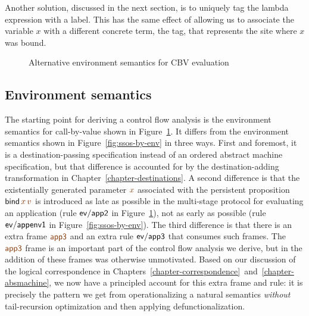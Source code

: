 Another solution, discussed in the next
section, is to uniquely tag the lambda expression with a label. This
has the same effect of allowing us to associate the variable $x$
with a different concrete term, the tag, that represents the site
where $x$ was bound.






\begin{figure}
\caption{Alternative environment semantics for CBV evaluation}
\label{fig:dest-env}
\end{figure}

\subsection{Environment semantics}


The starting point for deriving a control flow analysis is the
environment semantics for call-by-value shown in
Figure~\ref{fig:dest-env}. It differs from the environment semantics
shown in Figure~\ref{fig:ssos-by-env} in three ways. First and
foremost, it is a destination-passing specification instead of an
ordered abstract machine specification, but that difference is
accounted for by the destination-adding transformation in 
Chapter~\ref{chapter-destinations}.
A second difference is that the existentially generated parameter
$\lf{x}$ associated with the persistent proposition ${\sf
  bind}\,\lf{x}\,\lf{v}$ is introduced as late as possible in the
multi-stage protocol for evaluating an application (rule ${\sf
  ev/app2}$ in Figure~\ref{fig:dest-env}), not as early as possible
(rule ${\sf ev/appenv1}$ in Figure~\ref{fig:ssos-by-env}). The third
difference is that there is an extra frame $\lf{\sf app3}$ and an
extra rule ${\sf ev/app3}$ that consumes such frames. The $\lf{\sf
  app3}$ frame is an important part of the control flow analysis we
derive, but in \cite{simmons11logical} the addition of these frames
was otherwise unmotivated. Based on our discussion of the logical
correspondence in 
Chapters~\ref{chapter-correspondence}~and~\ref{chapter-absmachine}, 
we now have a principled account for this
extra frame and rule: it is precisely the pattern we get from
operationalizing a natural semantics {\it without} tail-recursion
optimization and then applying defunctionalization.

